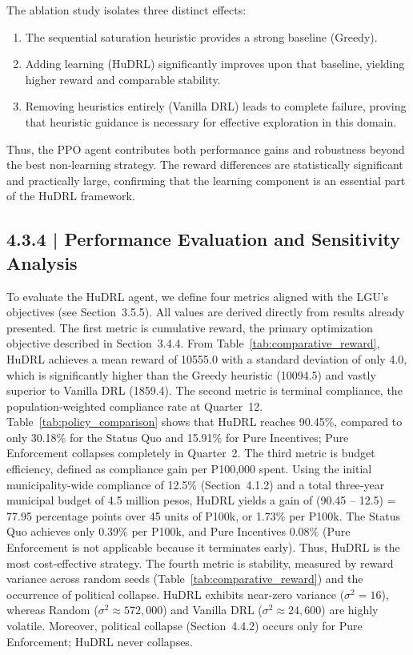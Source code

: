 The ablation study isolates three distinct effects:
\begin{enumerate}
    \item The sequential saturation heuristic provides a strong baseline (Greedy).
    \item Adding learning (HuDRL) significantly improves upon that baseline, yielding higher reward and comparable stability.
    \item Removing heuristics entirely (Vanilla DRL) leads to complete failure, proving that heuristic guidance is necessary for effective exploration in this domain.
\end{enumerate}
Thus, the PPO agent contributes both performance gains and robustness beyond the best non‑learning strategy. The reward differences are statistically significant and practically large, confirming that the learning component is an essential part of the HuDRL framework.

\subsection*{4.3.4 | Performance Evaluation and Sensitivity Analysis}

To evaluate the HuDRL agent, we define four metrics aligned with the LGU’s objectives (see Section~3.5.5). All values are derived directly from results already presented. The first metric is cumulative reward, the primary optimization objective described in Section~3.4.4. From Table~\ref{tab:comparative_reward}, HuDRL achieves a mean reward of 10555.0 with a standard deviation of only 4.0, which is significantly higher than the Greedy heuristic (10094.5) and vastly superior to Vanilla DRL (1859.4). The second metric is terminal compliance, the population‑weighted compliance rate at Quarter~12. Table~\ref{tab:policy_comparison} shows that HuDRL reaches 90.45\%, compared to only 30.18\% for the Status Quo and 15.91\% for Pure Incentives; Pure Enforcement collapses completely in Quarter~2. The third metric is budget efficiency, defined as compliance gain per P100,000 spent. Using the initial municipality‑wide compliance of 12.5\% (Section~4.1.2) and a total three‑year municipal budget of 4.5 million pesos, HuDRL yields a gain of (90.45 – 12.5) = 77.95 percentage points over 45 units of P100k, or 1.73\% per P100k. The Status Quo achieves only 0.39\% per P100k, and Pure Incentives 0.08\% (Pure Enforcement is not applicable because it terminates early). Thus, HuDRL is the most cost‑effective strategy. The fourth metric is stability, measured by reward variance across random seeds (Table~\ref{tab:comparative_reward}) and the occurrence of political collapse. HuDRL exhibits near‑zero variance ($\sigma^2 = 16$), whereas Random ($\sigma^2 \approx 572,000$) and Vanilla DRL ($\sigma^2 \approx 24,600$) are highly volatile. Moreover, political collapse (Section~4.4.2) occurs only for Pure Enforcement; HuDRL never collapses.

